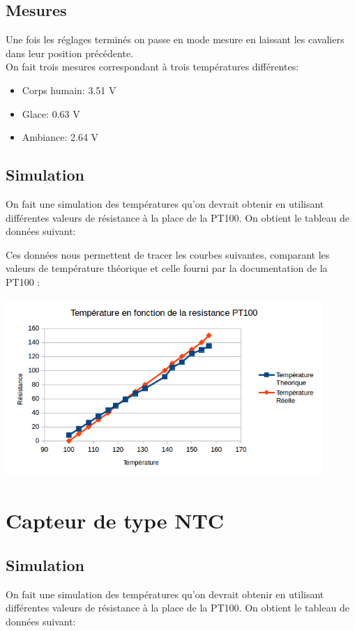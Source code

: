\documentclass[a4paper,12pt]{article}
\begin{document}
    \subsection{Mesures}
      \par Une fois les réglages terminés on passe en mode mesure en laissant les cavaliers dans leur position précédente.\\
      On fait trois mesures correspondant à trois températures différentes:
      \begin{itemize}
        \item Corps humain: 3.51 V
        \item Glace: 0.63 V
        \item Ambiance: 2.64 V
      \end{itemize}

    \subsection{Simulation}
      \par On fait une simulation des températures qu'on devrait obtenir en utilisant différentes valeurs de résistance à la place de la PT100.
			On obtient le tableau de données suivant:

      \par Ces données nous permettent de tracer les courbes suivantes, comparant les valeurs de température théorique et celle fourni par la documentation de la PT100 :
			\begin{center}
				\includegraphics[width=12cm]{../Images/GraphPT100.png}
			\end{center}
    \newpage

  \section{Capteur de type NTC}
		\subsection{Simulation}
			\par On fait une simulation des températures qu'on devrait obtenir en utilisant différentes valeurs de résistance à la place de la PT100.
			On obtient le tableau de données suivant:
\end{document}
